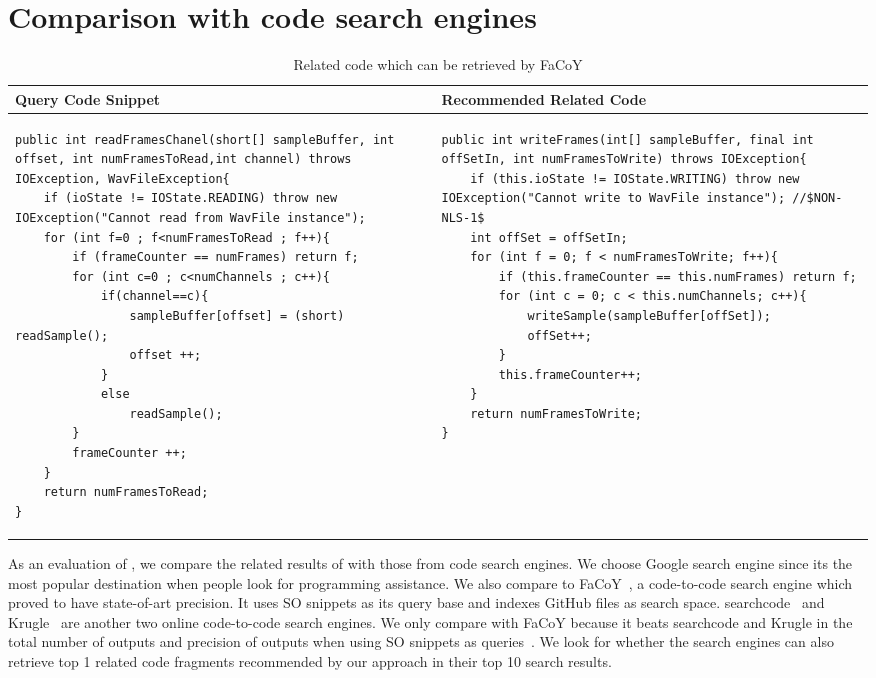 \section{Comparison with code search engines}


\lstset{
	frame=none,
	aboveskip=0pt,
	belowskip=0pt,
	basicstyle=\tiny\ttfamily,
}
\begin{table*}\scriptsize
	\caption{Related code which can be retrieved by FaCoY}
	\label{tab:facoy-example}
	
	\setlength{\tabcolsep}{0.01\textwidth}
	\begin{tabular}{@{}p{}p{}@{}}
		\toprule
		Query Code Snippet & Recommended Related Code \\
		\midrule


\begin{lstlisting}
public int readFramesChanel(short[] sampleBuffer, int offset, int numFramesToRead,int channel) throws IOException, WavFileException{
	if (ioState != IOState.READING) throw new IOException("Cannot read from WavFile instance");
	for (int f=0 ; f<numFramesToRead ; f++){
		if (frameCounter == numFrames) return f;
		for (int c=0 ; c<numChannels ; c++){
			if(channel==c){
				sampleBuffer[offset] = (short) readSample();
				offset ++;
			}
			else
				readSample();
		}
		frameCounter ++;
	}
	return numFramesToRead;
}
\end{lstlisting}
		
		&
\begin{lstlisting}
public int writeFrames(int[] sampleBuffer, final int offSetIn, int numFramesToWrite) throws IOException{
	if (this.ioState != IOState.WRITING) throw new IOException("Cannot write to WavFile instance"); //$NON-NLS-1$
	int offSet = offSetIn;
	for (int f = 0; f < numFramesToWrite; f++){
		if (this.frameCounter == this.numFrames) return f;
		for (int c = 0; c < this.numChannels; c++){
			writeSample(sampleBuffer[offSet]);
			offSet++;
		}
		this.frameCounter++;
	}
	return numFramesToWrite;
}
		
\end{lstlisting}
\\

\bottomrule
	\end{tabular}
\end{table*}
		

As an evaluation of {\tool}, we compare the related results of {\tool} with those from code search engines. We choose Google search engine since its the most popular destination when people look for programming assistance. We also compare to {\ttt FaCoY}~\cite{kim2018Facoy}, a code-to-code search engine which proved to have state-of-art precision. It uses SO snippets as its query base and indexes GitHub files as search space. {\ttt searchcode}~\cite{searchcode} and {\ttt Krugle}~\cite{krugle} are another two online code-to-code search engines. We only compare with {\ttt FaCoY} because it beats {\ttt searchcode} and {\ttt Krugle} in the total number of outputs and precision of outputs when using SO snippets as queries~\cite{kim2018Facoy}. 
We look for whether the search engines can also retrieve top 1 related code fragments recommended by our approach in their top 10 search results. 

